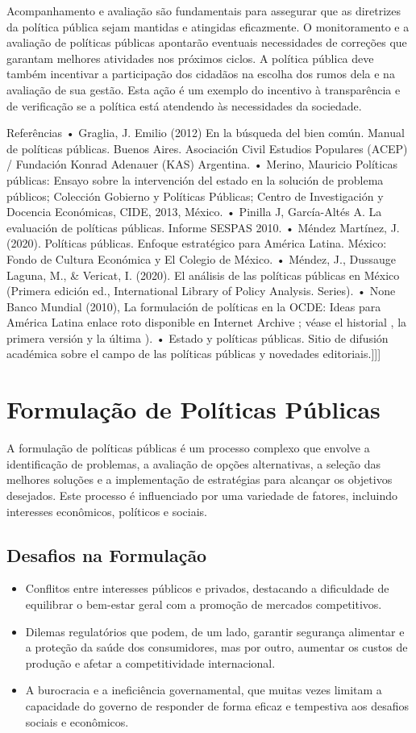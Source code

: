 \documentclass[
   article,       
   12pt,          
   oneside,       
   a4paper,       
   english,       
   brazil,        
   sumario=tradicional
   ]{abntex2}
\begin{document}
Acompanhamento e avaliação são fundamentais para assegurar que as diretrizes da política pública sejam mantidas e atingidas eficazmente. O monitoramento e a avaliação de políticas públicas apontarão eventuais necessidades de correções que garantam melhores atividades nos próximos ciclos. A política pública deve também incentivar a participação dos cidadãos na escolha dos rumos dela e na avaliação de sua gestão. Esta ação é um exemplo do incentivo à transparência e de verificação se a política está atendendo às necessidades da sociedade.


Referências
• Graglia, J. Emilio (2012) En la búsqueda del bien común. Manual de políticas públicas. Buenos Aires. Asociación Civil Estudios Populares (ACEP) / Fundación Konrad Adenauer (KAS) Argentina.
• Merino, Mauricio Políticas públicas: Ensayo sobre la intervención del estado en la solución de problema públicos; Colección Gobierno y Políticas Públicas; Centro de Investigación y Docencia Económicas, CIDE, 2013, México.
• Pinilla J, García-Altés A. La evaluación de políticas públicas. Informe SESPAS 2010.
• Méndez Martínez, J. (2020). Políticas públicas. Enfoque estratégico para América Latina. México: Fondo de Cultura Económica y El Colegio de México.
• Méndez, J., Dussauge Laguna, M., & Vericat, I. (2020). El análisis de las políticas públicas en México (Primera edición ed., International Library of Policy Analysis. Series).
• None Banco Mundial (2010), La formulación de políticas en la OCDE: Ideas para América Latina enlace roto disponible en Internet Archive ; véase el historial , la primera versión y la última ).
• Estado y políticas públicas. Sitio de difusión académica sobre el campo de las políticas públicas y novedades editoriais.]]]

\section{Formulação de Políticas Públicas}
A formulação de políticas públicas é um processo complexo que envolve a identificação de problemas, a avaliação de opções alternativas, a seleção das melhores soluções e a implementação de estratégias para alcançar os objetivos desejados. Este processo é influenciado por uma variedade de fatores, incluindo interesses econômicos, políticos e sociais.
    \subsection{Desafios na Formulação}
       \begin{itemize}
            \item Conflitos entre interesses públicos e privados, destacando a dificuldade de equilibrar o bem-estar geral com a promoção de mercados competitivos.
            \item Dilemas regulatórios que podem, de um lado, garantir segurança alimentar e a proteção da saúde dos consumidores, mas por outro, aumentar os custos de produção e afetar a competitividade internacional.
            \item A burocracia e a ineficiência governamental, que muitas vezes limitam a capacidade do governo de responder de forma eficaz e tempestiva aos desafios sociais e econômicos.
        \end{itemize}
\end{document}
